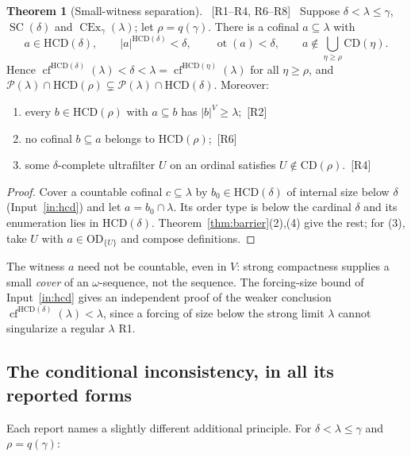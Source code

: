 \documentclass[11pt,letterpaper]{article}
\theoremstyle{definition}
\newtheorem{theorem}[definition]{Theorem}
\numberwithin{equation}{section}
\newcommand{\OD}{\mathrm{OD}}
\newcommand{\CD}{\mathrm{CD}}
\newcommand{\HCD}{\mathrm{HCD}}
\newcommand{\SC}{\operatorname{SC}}
\newcommand{\CEx}{\operatorname{CEx}}
\newcommand{\cf}{\operatorname{cf}}
\newcommand{\ot}{\operatorname{ot}}
\newcommand{\Pow}{\mathcal P}
\newcommand{\src}[1]{\unskip\ {\normalfont\small\sffamily\color{Olive}[#1]}\ }
\newcommand{\R}[1]{\textsf{R#1}}
\begin{document}
\begin{theorem}[Small-witness separation]\label{thm:sep}\src{R1--R4, R6--R8}
Suppose $\delta<\lambda\le\gamma$, $\SC(\delta)$ and $\CEx_\gamma(\lambda)$; let $\rho=q(\gamma)$. There is a cofinal $a\subseteq\lambda$ with
\[
a\in\HCD(\delta),\qquad|a|^{\HCD(\delta)}<\delta,\qquad\ot(a)<\delta,\qquad a\notin\textstyle\bigcup_{\eta\ge\rho}\CD(\eta).
\]
Hence $\cf^{\HCD(\delta)}(\lambda)<\delta<\lambda=\cf^{\HCD(\eta)}(\lambda)$ for all $\eta\ge\rho$, and $\Pow(\lambda)\cap\HCD(\rho)\subsetneq\Pow(\lambda)\cap\HCD(\delta)$. Moreover:
\begin{enumerate}
\item every $b\in\HCD(\rho)$ with $a\subseteq b$ has $|b|^V\ge\lambda$;\src{R2}
\item no cofinal $b\subseteq a$ belongs to $\HCD(\rho)$;\src{R6}
\item some $\delta$-complete ultrafilter $U$ on an ordinal satisfies $U\notin\CD(\rho)$.\src{R4}
\end{enumerate}
\end{theorem}

\begin{proof}
Cover a countable cofinal $c\subseteq\lambda$ by $b_0\in\HCD(\delta)$ of internal size below $\delta$ (Input~\ref{in:hcd}) and let $a=b_0\cap\lambda$. Its order type is below the cardinal $\delta$ and its enumeration lies in $\HCD(\delta)$. Theorem~\ref{thm:barrier}(2),(4) give the rest; for (3), take $U$ with $a\in\OD_{\{U\}}$ and compose definitions.
\end{proof}

The witness $a$ need not be countable, even in $V$: strong compactness supplies a small \emph{cover} of an $\omega$-sequence, not the sequence. The forcing-size bound of Input~\ref{in:hcd} gives an independent proof of the weaker conclusion $\cf^{\HCD(\delta)}(\lambda)<\lambda$, since a forcing of size below the strong limit $\lambda$ cannot singularize a regular $\lambda$ \R1.

\subsection{The conditional inconsistency, in all its reported forms}

Each report names a slightly different additional principle. For $\delta<\lambda\le\gamma$ and $\rho=q(\gamma)$:
\end{document}
